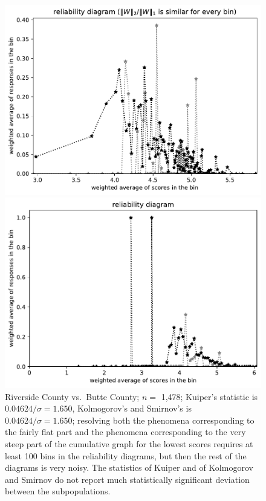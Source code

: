 \documentclass{article}
\newlength{\imsize}
\begin{document}
\begin{figure}
\begin{centering}
\parbox{\imsize}{\includegraphics[width=\imsize]
{../codes/weighted/County_of_Riverside_vs_Butte-LNGI/equierrs100.pdf}}
\quad\quad
\parbox{\imsize}{\includegraphics[width=\imsize]
{../codes/weighted/County_of_Riverside_vs_Butte-LNGI/equiscores100.pdf}}

\end{centering}
\caption{Riverside County vs.\ Butte County; $n =$ 1,478;
         Kuiper's statistic is $0.04624 / \sigma = 1.650$,
         Kolmogorov's and Smirnov's is $0.04624 / \sigma = 1.650$;
         resolving both the phenomena corresponding to the fairly flat part
         and the phenomena corresponding to the very steep part
         of the cumulative graph for the lowest scores requires
         at least 100 bins in the reliability diagrams, but then the rest
         of the diagrams is very noisy.
         The statistics of Kuiper and of Kolmogorov and Smirnov do not report
         much statistically significant deviation between the subpopulations.
}
\label{Riverside-Butte}
\end{figure}
\end{document}
